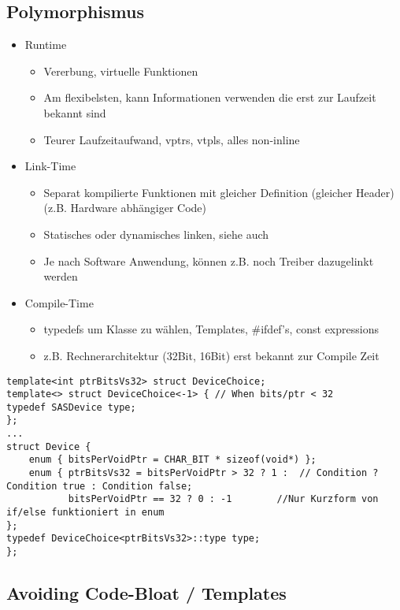 \subsection{Polymorphismus}
\begin{itemize}
	\item Runtime
		\begin{itemize}
			\item Vererbung, virtuelle Funktionen
			\item Am flexibelsten, kann Informationen verwenden die erst zur Laufzeit bekannt sind
			\item Teurer Laufzeitaufwand, vptrs, vtpls, alles non-inline
		\end{itemize}
	\item Link-Time
		\begin{itemize}
			\item Separat kompilierte Funktionen mit gleicher Definition (gleicher Header) (z.B.
				Hardware abhängiger Code)
			\item Statisches oder dynamisches linken, siehe auch 
			\item Je nach Software Anwendung, können z.B. noch Treiber dazugelinkt werden
		\end{itemize}
	\item Compile-Time
		\begin{itemize}
			\item typedefs um Klasse zu wählen, Templates, \#ifdef's, const expressions
			\item z.B. Rechnerarchitektur (32Bit, 16Bit) erst bekannt zur Compile Zeit 
		\end{itemize}
\end{itemize}
\begin{lstlisting}
template<int ptrBitsVs32> struct DeviceChoice;
template<> struct DeviceChoice<-1> { // When bits/ptr < 32
typedef SASDevice type;
};
...
struct Device {
    enum { bitsPerVoidPtr = CHAR_BIT * sizeof(void*) };
    enum { ptrBitsVs32 = bitsPerVoidPtr > 32 ? 1 :  // Condition ? Condition true : Condition false;
           bitsPerVoidPtr == 32 ? 0 : -1        //Nur Kurzform von if/else funktioniert in enum
};
typedef DeviceChoice<ptrBitsVs32>::type type;
};
\end{lstlisting}

\subsection{Avoiding Code-Bloat / Templates}
